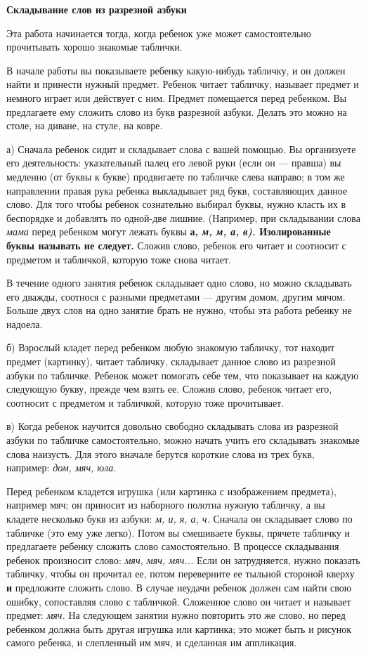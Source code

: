 \documentclass[a5paper]{book}
\renewcommand{\emph}[1]{\textit{#1}}
\begin{document}
\textbf{Складывание слов из разрезной азбуки}

Эта работа начинается тогда, когда ребенок уже может самостоятельно
прочитывать хорошо знакомые таблички.

В начале работы вы показываете ребенку какую-нибудь табличку, и он
должен найти и принести нужный предмет. Ребенок читает табличку,
называет предмет и немного играет или действует с ним. Предмет
помещается перед ребенком. Вы предлагаете ему сложить слово из букв
разрезной азбуки. Делать это можно на столе, на диване, на стуле, на
ковре.

а) Сначала ребенок сидит и складывает слова с вашей помощью. Вы
организуете его деятельность: указательный палец его левой руки (если он
--- правша) вы медленно (от буквы к букве) продвигаете по табличке слева
направо; в том же направлении правая рука ребенка выкладывает ряд букв,
составляющих данное слово. Для того чтобы ребенок сознательно выбирал
буквы, нужно класть их в беспорядке и добавлять по одной-две лишние.
(Например, при складывании слова \emph{мама} перед ребенком могут лежать
буквы \textbf{а, \emph{м, м, а, в).} Изолированные буквы называть не
следует.} Сложив слово, ребенок его читает и соотносит с предметом и
табличкой, которую тоже снова читает.

В течение одного занятия ребенок складывает одно слово, но можно
складывать его дважды, соотнося с разными предметами --- другим домом,
другим мячом. Больше двух слов на одно занятие брать не нужно, чтобы эта
работа ребенку не надоела.

б) Взрослый кладет перед ребенком любую знакомую табличку, тот находит
предмет (картинку), читает табличку, складывает данное слово из
разрезной азбуки по табличке. Ребенок может помогать себе тем, что
показывает на каждую следующую букву, прежде чем взять ее. Сложив слово,
ребенок читает его, соотносит с предметом и табличкой, которую тоже
прочитывает.

в) Когда ребенок научится довольно свободно складывать слова из
разрезной азбуки по табличке самостоятельно, можно начать учить его
складывать знакомые слова наизусть. Для этого вначале берутся короткие
слова из трех букв, например: \emph{дом, мяч, юла.}

Перед ребенком кладется игрушка (или картинка с изображением предмета),
например мяч; он приносит из наборного полотна нужную табличку, а вы
кладете несколько букв из азбуки: \emph{м, и, я, а, ч.} Сначала он
складывает слово по табличке (это ему уже легко). Потом вы смешиваете
буквы, прячете табличку и предлагаете ребенку сложить слово
самостоятельно. В процессе складывания ребенок произносит слово:
\emph{мяч, мяч, мяч...} Если он затрудняется, нужно показать табличку,
чтобы он прочитал ее, потом переверните ее тыльной стороной кверху
\textbf{и} предложите сложить слово. В случае неудачи ребенок должен сам
найти свою ошибку, сопоставляя слово с табличкой. Сложенное слово он
читает и называет предмет: \emph{мяч.} На следующем занятии нужно
повторить это же слово, но перед ребенком должна быть другая игрушка или
картинка; это может быть и рисунок самого ребенка, и слепленный им мяч,
и сделанная им аппликация.
\end{document}
